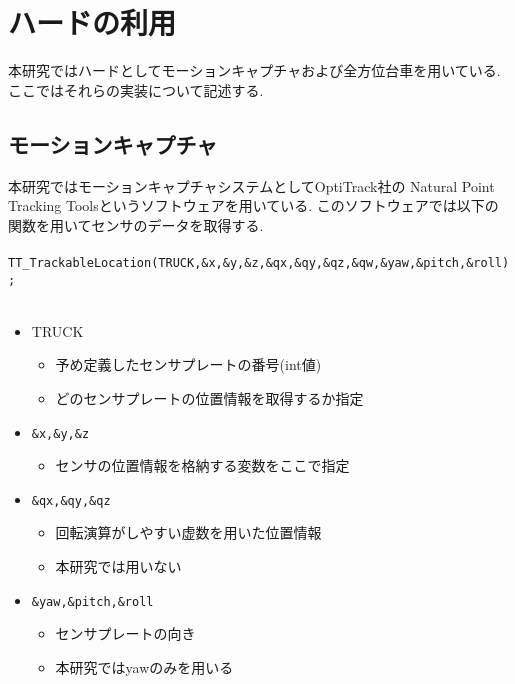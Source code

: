 \begin{comment}
\begin{figure}[!h]
\begin{center}

\texttt{[image: sensorplate.eps]}
\caption{センサプレート}
\label{sensorplate}
\end{center}
\end{figure}
\end{comment}


\section{ハードの利用}
本研究ではハードとしてモーションキャプチャおよび全方位台車を用いている.
ここではそれらの実装について記述する.
\subsection{モーションキャプチャ}
本研究ではモーションキャプチャシステムとしてOptiTrack社の
Natural Point Tracking Toolsというソフトウェアを用いている.
このソフトウェアでは以下の関数を用いてセンサのデータを取得する.
\\
\\
\verb|TT_TrackableLocation(TRUCK,&x,&y,&z,&qx,&qy,&qz,&qw,&yaw,&pitch,&roll);|
\\
\\

\begin{itemize}
\item TRUCK
\begin{itemize}
\item 予め定義したセンサプレートの番号(int値)
\item どのセンサプレートの位置情報を取得するか指定
\end{itemize}

\item \verb|&x,&y,&z|
\begin{itemize}
\item センサの位置情報を格納する変数をここで指定
\end{itemize}

\item \verb|&qx,&qy,&qz|
\begin{itemize}
\item 回転演算がしやすい虚数を用いた位置情報
\item 本研究では用いない
\end{itemize}

\item \verb|&yaw,&pitch,&roll|
\begin{itemize}
\item センサプレートの向き
\item 本研究ではyawのみを用いる
\end{itemize}
\end{itemize}

